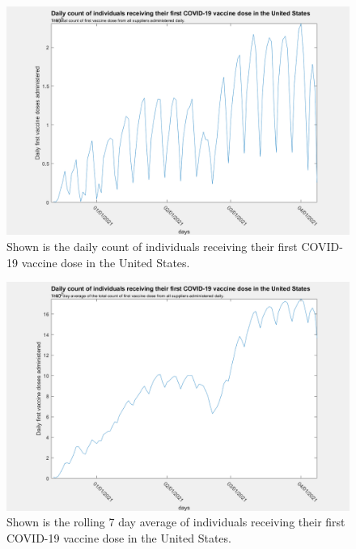 \documentclass[twoside]{article}
\begin{document}
\begin{multicols}{2}
\begin{figure}[H]
	\includegraphics[width=\linewidth]{images/usa_daily_first_doses_unprocessed.png}
	\caption{Shown is the daily count of individuals receiving their first COVID-19 vaccine dose in the United States. }
	\label{fig:images/usa_daily_first_doses_unprocessedLabel}
\end{figure}

\begin{figure}[H]
	\includegraphics[width=\linewidth]{images/usa_daily_first_doses_processed.png}
	\caption{Shown is the rolling 7 day average of individuals receiving their first COVID-19 vaccine dose in the United States.}
	\label{fig:images/usa_daily_first_doses_processedLabel}
\end{figure}


\end{multicols}
\end{document}
